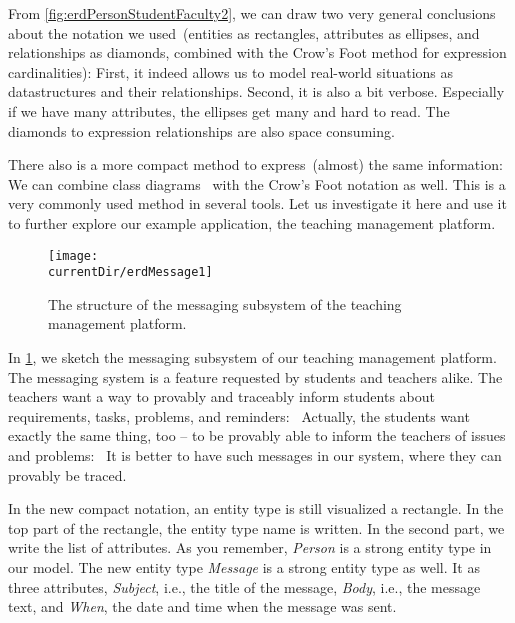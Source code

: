 %
\label{sec:compactCrowsFootNotation}%
%
From \cref{fig:erdPersonStudentFaculty2}, we can draw two very general conclusions about the notation we used~(entities as rectangles, attributes as ellipses, and relationships as diamonds, combined with the Crow's Foot method for expression cardinalities):
First, it indeed allows us to model real-world situations as datastructures and their relationships.
Second, it is also a bit verbose.
Especially if we have many attributes, the ellipses get many and hard to read.
The diamonds to expression relationships are also space consuming.

There also is a more compact method to express~(almost) the same information:
We can combine  class diagrams~\cite{OMG2017OUMLOU,RMHOSMUUIIIIOPPTRS1997UNG,BRJ1999TUMLRM,F2003UDABGTTSOML} with the Crow's Foot notation as well.
This is a very commonly used method in several tools.
Let us investigate it here and use it to further explore our example application, the teaching management platform.
%
\begin{figure}%
\centering%
\texttt{[image: \\currentDir/erdMessage1]}%
\caption{The structure of the messaging subsystem of the teaching management platform.}%
\label{fig:erdMessage1}%
\end{figure}%
%
In \cref{fig:erdMessage1}, we sketch the messaging subsystem of our teaching management platform.
The messaging system is a feature requested by students and teachers alike.
The teachers want a way to provably and traceably inform students about requirements, tasks, problems, and reminders:~\emph{}
Actually, the students want exactly the same thing, too -- to be provably able to inform the teachers of issues and problems:~\emph{}
It is better to have such messages in our system, where they can provably be traced.

In the new compact notation, an entity type is still visualized a rectangle.
In the top part of the rectangle, the entity type name is written.
In the second part, we write the list of attributes.
As you remember, \emph{Person} is a strong entity type in our model.
The new entity type \emph{Message} is a strong entity type as well.
It as three attributes, \emph{Subject}, i.e., the title of the message, \emph{Body}, i.e., the message text, and \emph{When}, the date and time when the message was sent.

